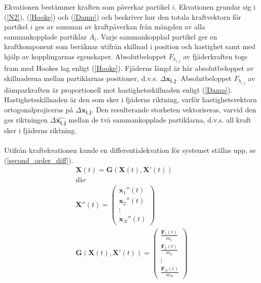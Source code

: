 \documentclass[a4paper,12pt,oneside,final,swedish]{extarticle}
\begin{document}
Ekvationen bestämmer kraften som påverkar partikel $i$. Ekvationen grundar sig i (\ref{N2}), (\ref{Hooke}) och (\ref{Damp}) och beskriver hur den totala kraftvektorn för partikel $i$ ges av summan av kraftpåverkan från mängden av alla sammankopplade partiklar $A_i$. Varje sammankopplad partikel ger en kraftkomponent som beräknas utifrån skillnad i position och hastighet samt med hjälp av kopplingarnas egenskaper. Absolutbeloppet $F_{k_{i,j}}$ av fjäderkraften togs fram med Hookes lag enligt (\ref{Hooke}). Fjäderns längd är här absolutbeloppet av skillnaderna mellan partiklarnas positioner, d.v.s. \begin{math} \Delta \mathbf{x_{i,j}}  \end{math}. Absolutbeloppet $F_{b_{i,j}}$ av dämparkraften är proportionell mot hastighetsskillnaden enligt (\ref{Damp}). Hastighetsskillnaden är den som sker i fjäderns riktning, varför hastighetsvektorn ortogonalprojiceras på \begin{math} \Delta \mathbf{x_{i,j}}  \end{math}. Den resulterande storheten vektoriseras, varvid den ges riktningen \begin{math} \Delta \mathbf{\hat{x_{i,j}}}  \end{math} mellan de två sammankopplade partiklarna, d.v.s. all kraft sker i fjäderns riktning.
\\\\Utifrån kraftekvationen kunde en differentialekvation för systemet ställas upp, se (\ref{second_order_diff}).
\begin{equation}
\begin{split}
\mathbf X(t)=\mathbf G(\mathbf X(t),\mathbf X'(t))\\ där\\ \mathbf X''(t)=\begin{pmatrix} \mathbf{ x }_{ 1 }''(t)
\\ \mathbf{ x }_{ 2 }''(t)
\\ \vdots 
\\ \mathbf{ x }_{ N }''(t) \end{pmatrix}
\\ \mathbf G(\mathbf X(t),\mathbf X'(t))=\begin{pmatrix} \frac { \mathbf{ F }_{ 1 }(t) }{ { m }_{ 1 } } 
\\ \frac { \mathbf{ F }_{ 2 }(t) }{ { m }_{ 2 } }
\\ \vdots 
\\ \frac { \mathbf{ F }_{ N }(t) }{ { m }_{ N } }  \end{pmatrix}
\end{split}
\label{second_order_diff}
\end{equation}
\end{document}
